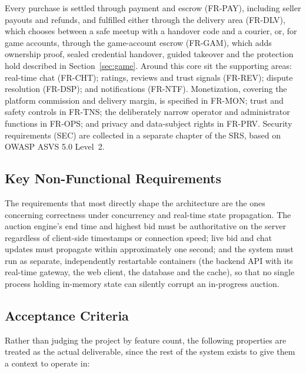 \documentclass[11pt,a4paper]{article}
\begin{document}
Every purchase is settled through payment and escrow (FR-PAY), including seller payouts and refunds,
and fulfilled either through the delivery area (FR-DLV), which chooses between a safe meetup with a
handover code and a courier, or, for game accounts, through the game-account escrow (FR-GAM), which adds
ownership proof, sealed credential handover, guided takeover and the protection hold described in
Section~\ref{sec:game}. Around this core sit the supporting areas: real-time chat (FR-CHT); ratings,
reviews and trust signals (FR-REV); dispute resolution (FR-DSP); and notifications (FR-NTF).
Monetization, covering the platform commission and delivery margin, is specified in FR-MON;
trust and safety controls in FR-TNS; the deliberately narrow operator and administrator functions in
FR-OPS; and privacy and data-subject rights in FR-PRV. Security requirements (SEC) are collected in a
separate chapter of the SRS, based on OWASP ASVS 5.0 Level~2.

\subsection{Key Non-Functional Requirements}

The requirements that most directly shape the architecture are the ones concerning correctness under
concurrency and real-time state propagation. The auction engine's end time and highest bid must be
authoritative on the server regardless of client-side timestamps or connection speed; live bid and chat
updates must propagate within approximately one second; and the system must run as separate,
independently restartable containers (the backend API with its real-time gateway, the web client, the
database and the cache), so that no single process holding in-memory state can silently corrupt an
in-progress auction.

\subsection{Acceptance Criteria}

Rather than judging the project by feature count, the following properties are treated as the actual
deliverable, since the rest of the system exists to give them a context to operate in:
\end{document}
